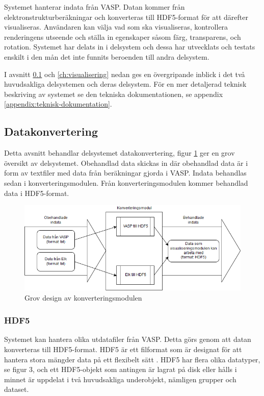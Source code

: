 \documentclass[a4paper,12pt]{article}
\begin{document}
Systemet hanterar indata från VASP. Datan kommer från elektronstrukturberäkningar och konverteras till HDF5-format för att därefter visualiseras. Användaren kan välja vad som ska visualiseras, kontrollera renderingens utseende och ställa in egenskaper såsom färg, transparens, och rotation. Systemet har delats in i delsystem och dessa har utvecklats och testats enskilt i den mån det inte funnits beroenden till andra delsystem.

I avsnitt \ref{ch:datakonvertering} och \ref{ch:visualisering} nedan ges en övergripande inblick i det två huvudsakliga delsystemen och deras delsystem. För en mer detaljerad teknisk beskriving av systemet se den tekniska dokumentationen, se appendix \ref{appendix:teknisk-dokumentation}.

\subsection{Datakonvertering}
\label{ch:datakonvertering}
Detta avsnitt behandlar delsystemet datakonvertering, figur \ref{fig:konverteringdetalj} ger en grov översikt av delsystemet. Obehandlad data skickas in där obehandlad data är i form av textfiler med data från beräkningar gjorda i VASP. Indata behandlas sedan i konverteringsmodulen. Från konverteringsmodulen kommer behandlad data i HDF5-format.

\begin{figure}[H]
	\centering
	\includegraphics[scale=0.55]{konverteringdetalj.png}
	\caption{Grov design av konverteringsmodulen}
	\label{fig:konverteringdetalj}
\end{figure}

\subsubsection{HDF5}
Systemet kan hantera olika utdatafiler från VASP. Detta görs genom att datan konverteras till HDF5-format.
HDF5 är ett filformat som är designat för att hantera stora mängder data på ett flexibelt sätt \cite{hdf5}.
HDF5 har flera olika datatyper, se figur 3, och ett HDF5-objekt som antingen är lagrat på disk eller hålls i minnet är uppdelat i två huvudsakliga underobjekt, nämligen grupper och dataset.
\end{document}
